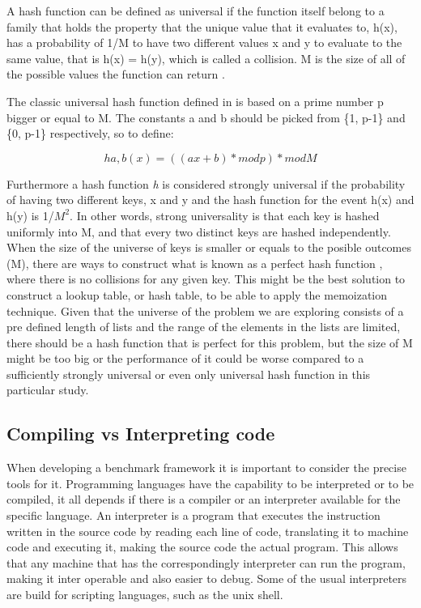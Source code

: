 \documentclass[a4paper,12pt]{article}
\begin{document}
A hash function can be defined as universal if the function itself belong to a family that holds the property that the unique value that it evaluates to, h(x), has a probability of 1/M to have two different values x and y to evaluate to the same value, that is h(x) = h(y), which is called a collision. M is the size of all of the possible values the function can return \cite{carter1979universal}.

The classic universal hash function defined in \cite{carter1979universal} is based on a prime number p bigger or equal to M. The constants a and b should be picked from  \{1, p-1\} and  \{0, p-1\} respectively, so to define:

\begin{equation}
    ha,b(x) = ((ax + b)  * mod p) * mod M 
\end{equation}


Furthermore a hash function {\it h} is considered strongly universal if the probability of having two different keys, x and y and the hash function for the event h(x) and h(y) is 1/$M^{2}$. In other words, strong universality is that each key is hashed uniformly into M, and that every two distinct keys are hashed independently.\\

When the size of the universe of keys is smaller or equals to the posible outcomes (M), there are ways to construct what is known as a perfect hash function  \cite{sprugnoli1977perfect}, where there is no collisions for any given key.  This might be the best solution to construct a lookup table, or hash table, to be able to apply the memoization technique. Given that the universe of the problem we are exploring consists of a pre defined length of lists and the range of the elements in the lists are limited, there should be a hash function that is perfect for this problem, but the size of M might be too big or the performance of it  could be worse compared to a sufficiently strongly universal or even only universal hash function in this particular study.

\subsection{Compiling vs Interpreting code}
When developing a benchmark framework it is important to consider the precise tools for it. Programming languages have the capability to be interpreted or to be compiled, it all depends if there is a compiler or an interpreter available for the specific language. An interpreter is a program that executes the instruction written in the source code by reading each line of code, translating it to machine code and executing it, making the source code the actual program. This allows that any machine that has the correspondingly interpreter can run the program, making it inter operable and also easier to debug. Some of the usual interpreters are build for scripting languages, such as the unix shell.
\end{document}
